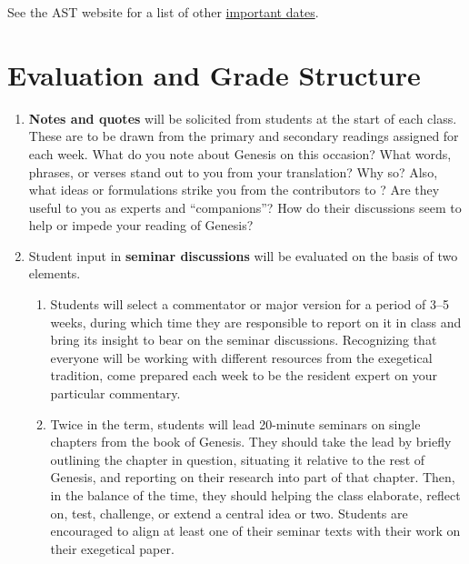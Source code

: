 \documentclass[titlepage]{article}
\begin{document}
See the AST website for a list of other \href{http://www.astheology.ns.ca/students/academic-dates.html}{important dates}.

\section{Evaluation and Grade Structure}
\label{evaluation}

\begin{enumerate}

	\item \textbf{Notes and quotes} will be solicited from students at the
	start of each class. These are to be drawn from the primary and
	secondary readings assigned for each week. What do you note about
	Genesis on this occasion? What words, phrases, or verses stand out to
	you from your translation? Why so? Also, what ideas or formulations
	strike you from the contributors to \cite{ccg}? Are they useful to you
	as experts and “companions”? How do their discussions seem to help or
	impede your reading of Genesis?

	\item Student input in \textbf{seminar discussions} will be evaluated on
	the basis of two elements.

	\begin{enumerate}

		\item Students will select a commentator or major version for a
		period of 3--5 weeks, during which time they are responsible to
		report on it in class and bring its insight to bear on the seminar
		discussions. Recognizing that everyone will be working with
		different resources from the exegetical tradition, come prepared
		each week to be the resident expert on your particular commentary.

		\item Twice in the term, students will lead 20-minute seminars on
		single chapters from the book of Genesis. They should take the lead
		by briefly outlining the chapter in question, situating it relative
		to the rest of Genesis, and reporting on their research into part of
		that chapter. Then, in the balance of the time, they should helping
		the class elaborate, reflect on, test, challenge, or extend a
		central idea or two. Students are encouraged to align at least one
		of their seminar texts with their work on their exegetical paper.

	\end{enumerate}


\end{enumerate}
\end{document}
